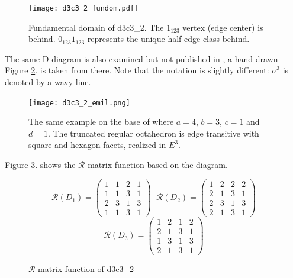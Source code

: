 \documentclass[12pt,a4paper]{article}
\numberwithin{equation}{section}
\theoremstyle{plain}%
\theoremstyle{definition}
\theoremstyle{remark}
\begin{document}
\begin{figure}
  \caption{\label{fig:d3c3_2_fundom} Fundamental domain of d3c3\_2. The
  $1_{123}$ vertex (edge center) is behind. $0_{123}1_{123}$ represents the
  unique half-edge class behind.}
  \center
  \texttt{[image: d3c3\_2\_fundom.pdf]}
\end{figure}

The same D-diagram is also examined but not published in \cite{DHM93}, a hand drawn Figure
\ref{fig:d3c3_2_emil}. is taken from there. Note that the notation is slightly
different: $\sigma^3$ is denoted by a wavy line.

\begin{figure}
  \caption{\label{fig:d3c3_2_emil} The same example on the base of
  \cite{DHM93} where $a=4$, $b=3$, $c=1$ and $d=1$. The truncated regular
  octahedron is edge transitive with square and hexagon facets, realized in
  $E^3$.}
  \center
  \texttt{[image: d3c3\_2\_emil.png]}
\end{figure}

Figure \ref{fig:d3c3_2_r}. shows the $\mathcal{R}$ matrix function based on the
diagram.%

\begin{figure}
  \caption{\label{fig:d3c3_2_r} $\mathcal{R}$ matrix function of d3c3\_2}
  \begin{equation*}
    \mathcal{R}(D_1)=
    \left(
    \begin{array}{cccc}
      1 & 1 & 2 & 1\\
      1 & 1 & 3 & 1\\
      2 & 3 & 1 & 3\\
      1 & 1 & 3 & 1
    \end{array}
    \right)\;\;
    \mathcal{R}(D_2)=
    \left(
    \begin{array}{cccc}
      1 & 2 & 2 & 2\\
      2 & 1 & 3 & 1\\
      2 & 3 & 1 & 3\\
      2 & 1 & 3 & 1
    \end{array}
    \right)
  \end{equation*}
  \begin{equation*}
    \mathcal{R}(D_3)=
    \left(
    \begin{array}{cccc}
      1 & 2 & 1 & 2\\
      2 & 1 & 3 & 1\\
      1 & 3 & 1 & 3\\
      2 & 1 & 3 & 1
    \end{array}
    \right)
  \end{equation*}
\end{figure}
\end{document}
